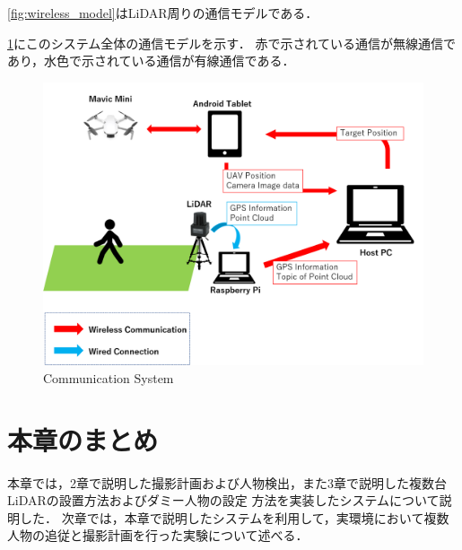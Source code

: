 \documentclass[autodetect-engine,dvipdfmx-if-dvi,ja=standard,a4j,jbase=11pt,magstyle=nomag*]{bxjsreport}
\begin{document}
\cref{fig:wireless_model}はLiDAR周りの通信モデルである．

\cref{fig:system}にこのシステム全体の通信モデルを示す．
赤で示されている通信が無線通信であり，水色で示されている通信が有線通信である．

\newpage
\begin{figure}[p]
    \centering
    \includegraphics[width=1.0\linewidth, clip]{./figure/chapter4/communication_model.png}
    \caption{Communication System}
    \label{fig:system}
\end{figure}


\newpage
\section{本章のまとめ}
本章では，2章で説明した撮影計画および人物検出，また3章で説明した複数台LiDARの設置方法およびダミー人物の設定
方法を実装したシステムについて説明した．
次章では，本章で説明したシステムを利用して，実環境において複数人物の追従と撮影計画を行った実験について述べる．
\end{document}
